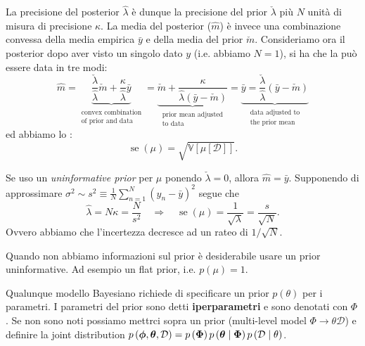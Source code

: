 \documentclass[10pt]{article}
\begin{document}
    La precisione del posterior \(\hat{\lambda}\) è dunque la precisione del prior \(\check{\lambda}\)
    più \(N\) unità di misura di precisione \(\kappa\). La media del posterior (\(\hat{m}\)) è invece
    una combinazione convessa della media empirica \(\bar{y}\) e della media del prior \(\check{m}\).
    Consideriamo ora il posterior dopo aver visto un singolo dato \(y\) (i.e. abbiamo \(N = 1\)),
    si ha che la  può essere data in tre modi:
    \begin{equation}
        \hat{m} = \underbrace{\frac{\check{\lambda}}{\hat{\lambda}}\check{m} + \frac{\kappa}{\hat{\lambda}}\bar{y}}_{\substack{\text{convex combination}\\ \text{of prior and data}}}
        = \underbrace{\check{m} + \frac{\kappa}{\hat{\lambda} \left( \bar{y} - \check{m} \right)}}_{\substack{\text{prior mean adjusted}\\ \text{to data}}}
        = \underbrace{\bar{y} = \frac{\check{\lambda}}{\hat{\lambda}}\left( \bar{y} - \check{m} \right)}_{\substack{\text{data adjusted to} \\ \text{the prior mean}}}
    \end{equation}
    ed abbiamo lo :
    \begin{equation}
        \operatorname{se} \left( \mu \right) = \sqrt{\mathbb{V}\left[ \mu \left[ \mathcal{D} \right] \right]}.
    \end{equation}

    Se uso un \textit{uninformative prior} per \(\mu\) ponendo \(\check{\lambda} = 0\), allora \(\hat{m} = \bar{y}\).
    Supponendo di approssimare \(\sigma^2 \sim s^2 \equiv \frac{1}{N}\sum_{n=1}^N \left( y_n - \bar{y} \right)^2\) segue che
    \begin{equation}
        \hat{\lambda} = N\kappa = \frac{N}{s^2} \quad \Longrightarrow \quad \operatorname{se} \left( \mu \right) = \frac{1}{\sqrt{\lambda}} = \frac{s}{\sqrt{N}}.
    \end{equation}
    Ovvero abbiamo che l'incertezza decresce ad un rateo di \(1/\sqrt{N}\).

    \begin{observation}
        Quando non abbiamo informazioni sul prior è desiderabile usare un prior uninformative.
        Ad esempio un flat prior, i.e. \(p \left( \mu \right) = 1 \).
    \end{observation}

    \begin{observation}
        Qualunque modello Bayesiano richiede di specificare un prior \(p \left( \theta \right)\) per i parametri.
        I parametri del prior sono detti \textbf{iperparametri} e sono denotati con \(\Phi\). Se non
        sono noti possiamo mettrci sopra un prior (multi-level model \(\Phi\rightarrow\theta\mathcal{D}\)) e
        definire la joint distribution \(p \left( \bm{\phi}, \bm{\theta}, \mathcal{D} \right) = p \left( \bm{\Phi} \right) p \left( \bm{\theta} \mid \bm{\Phi}\right) p \left( \mathcal{D} \mid \theta \right)\).
    \end{observation}
\end{document}
